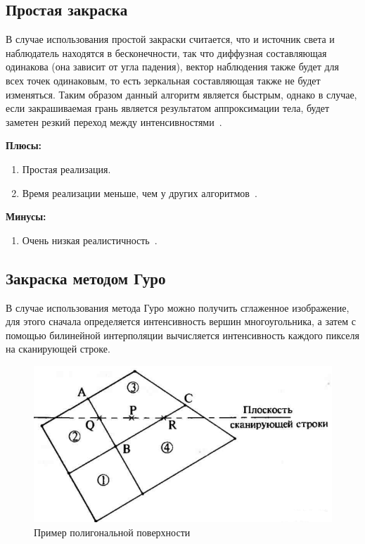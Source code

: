 \subsection{Простая закраска}
В случае использования простой закраски считается, что и источник света и наблюдатель находятся в бесконечности,
так что диффузная составляющая одинакова (она зависит от угла падения), вектор наблюдения также будет для всех точек одинаковым, то есть зеркальная составляющая также не будет изменяться. 
Таким образом данный алгоритм является быстрым, однако в случае, если закрашиваемая грань является результатом аппроксимации тела, будет заметен резкий переход между интенсивностями~\cite{Rodgers}.

\textbf{Плюсы:}
\begin{enumerate}
	\item Простая реализация.
	\item Время реализации меньше, чем у других алгоритмов~\cite{Rodgers}.
\end{enumerate}

\textbf{Минусы:}
\begin{enumerate}
	\item Очень низкая реалистичность~\cite{Rodgers}.
\end{enumerate}


\subsection{Закраска методом Гуро}
В случае использования метода Гуро можно получить сглаженное изображение, для этого сначала определяется интенсивность вершин многоугольника, а затем с помощью билинейной интерполяции вычисляется интенсивность каждого пикселя на сканирующей строке.

\begin{figure}[H]
	\centering
	\includegraphics{images/guro.png}
	\caption{Пример полигональной поверхности}
	\label{fig:guro_polygon}
\end{figure} 

